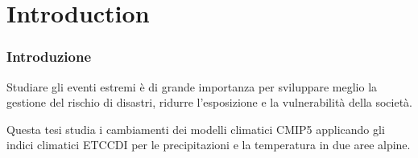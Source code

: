 \documentclass[14pt,usenames,dvipsnames]{beamer}
\begin{document}
\section{Introduction}



\begin{frame}
\frametitle{Introduzione}
Studiare gli eventi estremi è di grande importanza per sviluppare meglio la gestione del rischio di disastri, ridurre l'esposizione e la vulnerabilità della società. 

\vspace{10pt}
Questa tesi studia i cambiamenti dei modelli climatici CMIP5 applicando gli indici climatici ETCCDI per le precipitazioni e la temperatura in due aree alpine.
\end{frame}



%
%
%
%
%
%

\end{document}
